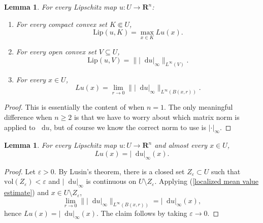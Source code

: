 \documentclass[reqno,11pt]{amsart}
\newcommand{\RR}{\mathbf{R}}
\newcommand*\dif{\mathop{}\!\mathrm{d}}
\newcommand{\vol}{\mathrm{vol}}
\newcommand{\Lip}{\mathrm{Lip}}
\newtheorem{lemma}[theorem]{Lemma}
\theoremstyle{definition}
\numberwithin{equation}{section}
\begin{document}
\begin{lemma}
For every Lipschitz map $u: U \to \RR^n$:
\begin{enumerate}
\item For every compact convex set $K \Subset U$,
\begin{equation}\label{Lip is sup of local Lips}
\Lip(u, K) = \max_{x \in K} Lu(x).
\end{equation}
\item For every open convex set $V \subseteq U$,
\begin{equation}\label{mean value estimate}
\Lip(u, V) = \||\dif u|_\infty\|_{L^\infty(V)}.
\end{equation}
\item For every $x \in U$,
\begin{equation}\label{localized mean value estimate}
Lu(x) = \lim_{r \to 0} \||\dif u|_\infty\|_{L^\infty(B(x, r))}.
\end{equation}
\end{enumerate}
\end{lemma}
\begin{proof}
This is essentially the content of \cite[Lemma 4.2]{Crandall2008} when $n = 1$.
The only meaningful difference when $n \geq 2$ is that we have to worry about which matrix norm is applied to $\dif u$, but of course we know the correct norm to use is $|\cdot|_\infty$.
\end{proof}

\begin{lemma}\label{Lip is du}
For every Lipschitz map $u: U \to \RR^n$ and almost every $x \in U$,
$$Lu(x) = |\dif u|_\infty(x).$$
\end{lemma}
\begin{proof}
Let $\varepsilon > 0$.
By Lusin's theorem, there is a closed set $Z_\varepsilon \subset U$ such that $\vol(Z_\varepsilon) < \varepsilon$ and $|\dif u|_\infty$ is continuous on $U \setminus Z_\varepsilon$.
Applying (\ref{localized mean value estimate}) and $x \in U \setminus Z_\varepsilon$,
$$\lim_{r \to 0} \||\dif u|_\infty\|_{L^\infty(B(x, r))} = |\dif u|_\infty(x),$$
hence $Lu(x) = |\dif u|_\infty(x)$.
The claim follows by taking $\varepsilon \to 0$.
\end{proof}
\end{document}
